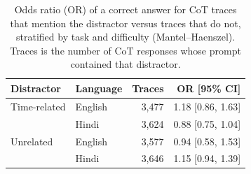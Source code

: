 \begin{table}[ht]
\centering
\small
\begin{tabular}{llrr}
\toprule
Distractor & Language & Traces & OR [95\% CI] \\
\midrule
Time-related & English & 3,477 & 1.18 [0.86, 1.63] \\
 & Hindi & 3,624 & 0.88 [0.75, 1.04] \\
\midrule
Unrelated & English & 3,577 & 0.94 [0.58, 1.53] \\
 & Hindi & 3,646 & 1.15 [0.94, 1.39] \\
\bottomrule
\end{tabular}
\caption{Odds ratio (OR) of a correct answer for CoT traces that mention the distractor versus traces that do not, stratified by task and difficulty (Mantel--Haenszel). Traces is the number of CoT responses whose prompt contained that distractor.}
\label{tab:mention-or}
\end{table}
